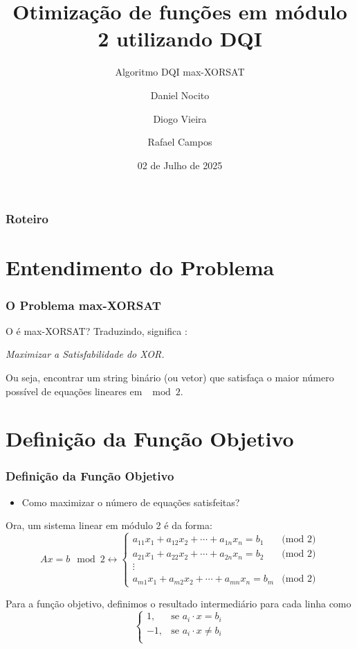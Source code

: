 \documentclass[aspectratio=169]{beamer}
\title{Otimização de funções em módulo 2 utilizando DQI}
\subtitle{Algoritmo DQI max-XORSAT}
\author{Daniel Nocito \and Diogo Vieira \and Rafael Campos}
\institute{UFRJ}
\date{02 de Julho de 2025}
\begin{document}
\begin{frame}
  \titlepage
\end{frame}

\begin{frame}
  \frametitle{Roteiro}
  \tableofcontents
\end{frame}

\section{Entendimento do Problema}
\begin{frame}
  \frametitle{O Problema max-XORSAT}

  O é max-XORSAT? Traduzindo, significa :
  \begin{center}
    \textit{Maximizar a Satisfabilidade do XOR.}
  \end{center}

  Ou seja, encontrar um string binário (ou vetor) que satisfaça o maior número possível de equações lineares em $\mod 2$.

\end{frame}

\section{Definição da Função Objetivo}
\begin{frame}
  \frametitle{Definição da Função Objetivo}
  \begin{itemize}
    \item Como maximizar o número de equações satisfeitas?
  \end{itemize}
  Ora, um sistema linear em módulo 2 é da forma:
  \[
  Ax=b \mod2
  \longleftrightarrow
    \begin{cases} 
      a_{11} x_1 + a_{12} x_2 + \cdots + a_{1n}x_n = b_1 & \text{(mod 2)} \\
      a_{21} x_1 + a_{22} x_2 + \cdots + a_{2n}x_n = b_2 & \text{(mod 2)} \\
      \vdots \\
      a_{m1} x_1 + a_{m2} x_2 + \cdots + a_{mn}x_n = b_m & \text{(mod 2)}
    \end{cases}
    \]
  
  Para a função objetivo, definimos o resultado intermediário para cada linha como
  $$
  \begin{cases}
    1, & \text{se } a_i\cdot x = b_i \\
    -1, & \text{se } a_i\cdot x \neq b_i \\
  \end{cases}
  $$
\end{frame}
\end{document}
